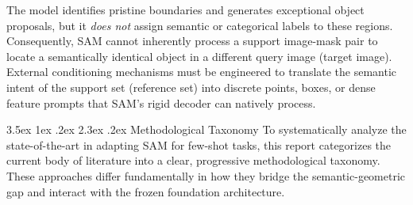 \documentclass[journal,12pt,onecolumn,draftclsnofoot]{IEEEtran}
\makeatletter
\renewcommand{\section}{\@startsection{section}{1}{\z@}%
    {3.5ex \@plus 1ex \@minus .2ex}%
    {2.3ex \@plus.2ex}%
    {\normalfont\Large\bfseries}}
\makeatother
\begin{document}
The model identifies pristine boundaries and generates exceptional object proposals, but it \textit{does not} assign semantic or categorical labels to these regions. Consequently, SAM cannot inherently process a support image-mask pair to locate a semantically identical object in a different query image (target image). External conditioning mechanisms must be engineered to translate the semantic intent of the support set (reference set) into discrete points, boxes, or dense feature prompts that SAM's rigid decoder can natively process.

\section{Methodological Taxonomy}
To systematically analyze the state-of-the-art in adapting SAM for few-shot tasks, this report categorizes the current body of literature into a clear, progressive methodological taxonomy. These approaches differ fundamentally in how they bridge the semantic-geometric gap and interact with the frozen foundation architecture.
\end{document}
